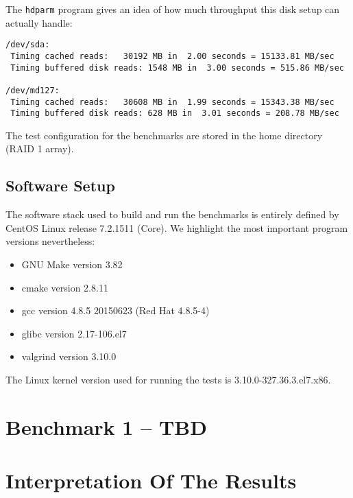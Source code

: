 The \texttt{hdparm} program gives an idea of how much throughput this disk setup can actually handle:

\begin{lstlisting}[caption={Disk performance on the benchmark machine}]
/dev/sda:
 Timing cached reads:   30192 MB in  2.00 seconds = 15133.81 MB/sec
 Timing buffered disk reads: 1548 MB in  3.00 seconds = 515.86 MB/sec

/dev/md127:
 Timing cached reads:   30608 MB in  1.99 seconds = 15343.38 MB/sec
 Timing buffered disk reads: 628 MB in  3.01 seconds = 208.78 MB/sec
\end{lstlisting}

The test configuration for the benchmarks are stored in the home directory (RAID 1 array).

  \subsection{Software Setup}

The software stack used to build and run the benchmarks is entirely defined by CentOS Linux release 7.2.1511 (Core).
We highlight the most important program versions nevertheless:

\begin{itemize}
  \item GNU Make version 3.82
  \item cmake version 2.8.11
  \item gcc version 4.8.5 20150623 (Red Hat 4.8.5-4)
  \item glibc version 2.17-106.el7
  \item valgrind version 3.10.0
\end{itemize}

The Linux kernel version used for running the tests is 3.10.0-327.36.3.el7.x86.

\section{Benchmark 1 -- TBD}

\section{Interpretation Of The Results}
